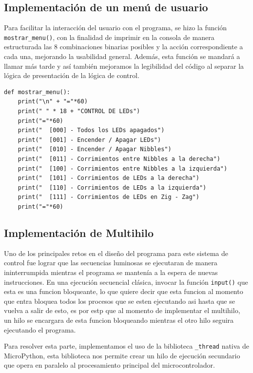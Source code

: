 \documentclass[letterpaper,12pt]{article}
\begin{document}
    \subsection{Implementación de un menú de usuario}
    Para facilitar la interacción del usuario con el programa, se hizo la función \texttt{mostrar\_menu()}, con la finalidad de imprimir en la consola de manera estructurada las 8 combinaciones binarias posibles y la acción correspondiente a cada una, mejorando la usabilidad general. Además, esta función se mandará a llamar más tarde y así también mejoramos la legibilidad del código al separar la lógica de presentación de la lógica de control.
    
    \begin{lstlisting}[language={[LAB]Python}, caption={Interfaz de menú y función de lectura en hilo secundario}]
def mostrar_menu():
    print("\n" + "="*60)
    print(" " * 18 + "CONTROL DE LEDs")
    print("="*60)
    print("  [000] - Todos los LEDs apagados")
    print("  [001] - Encender / Apagar LEDs")
    print("  [010] - Encender / Apagar Nibbles")
    print("  [011] - Corrimientos entre Nibbles a la derecha")
    print("  [100] - Corrimientos entre Nibbles a la izquierda")
    print("  [101] - Corrimientos de LEDs a la derecha")
    print("  [110] - Corrimientos de LEDs a la izquierda")
    print("  [111] - Corrimientos de LEDs en Zig - Zag")
    print("="*60)
    \end{lstlisting}

    \subsection{Implementación de Multihilo}
    Uno de los principales retos en el diseño del programa para este sistema de control fue lograr que las secuencias luminosas se ejecutaran de manera ininterrumpida mientras el programa se mantenía a la espera de nuevas instrucciones. En una ejecución secuencial clásica, invocar la función \texttt{input()} que esta es una funcion bloqueante, lo que quiere decir que esta funcion al momento que entra bloquea todos los procesos que se esten ejecutando asi hasta que se vuelva a salir de esto, es por estp que al momento de implementar el multihilo, un hilo se encargara de esta funcion bloqueando mientras el otro hilo seguira ejecutando el programa.

    Para resolver esta parte, implementamos el uso de la biblioteca \texttt{\_thread} nativa de MicroPython, esta biblioteca nos permite crear un hilo de ejecución secundario que opera en paralelo al procesamiento principal del microcontrolador.
    
\end{document}
